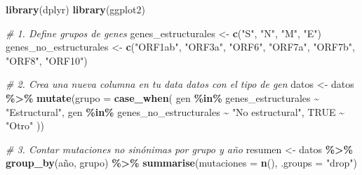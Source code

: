 \documentclass[
]{article}
\newenvironment{Shaded}{\begin{snugshade}}{\end{snugshade}}
\newcommand{\AttributeTok}[1]{\textcolor[rgb]{0.13,0.29,0.53}{#1}}
\newcommand{\CommentTok}[1]{\textcolor[rgb]{0.56,0.35,0.01}{\textit{#1}}}
\newcommand{\ConstantTok}[1]{\textcolor[rgb]{0.56,0.35,0.01}{#1}}
\newcommand{\FunctionTok}[1]{\textcolor[rgb]{0.13,0.29,0.53}{\textbf{#1}}}
\newcommand{\NormalTok}[1]{#1}
\newcommand{\OtherTok}[1]{\textcolor[rgb]{0.56,0.35,0.01}{#1}}
\newcommand{\SpecialCharTok}[1]{\textcolor[rgb]{0.81,0.36,0.00}{\textbf{#1}}}
\newcommand{\StringTok}[1]{\textcolor[rgb]{0.31,0.60,0.02}{#1}}
\begin{document}
\begin{Shaded}
\begin{Highlighting}[]
\FunctionTok{library}\NormalTok{(dplyr)}
\FunctionTok{library}\NormalTok{(ggplot2)}

\CommentTok{\# 1. Define grupos de genes}
\NormalTok{genes\_estructurales }\OtherTok{\textless{}{-}} \FunctionTok{c}\NormalTok{(}\StringTok{"S"}\NormalTok{, }\StringTok{"N"}\NormalTok{, }\StringTok{"M"}\NormalTok{, }\StringTok{"E"}\NormalTok{)}
\NormalTok{genes\_no\_estructurales }\OtherTok{\textless{}{-}} \FunctionTok{c}\NormalTok{(}\StringTok{"ORF1ab"}\NormalTok{, }\StringTok{"ORF3a"}\NormalTok{, }\StringTok{"ORF6"}\NormalTok{, }\StringTok{"ORF7a"}\NormalTok{, }\StringTok{"ORF7b"}\NormalTok{, }\StringTok{"ORF8"}\NormalTok{, }\StringTok{"ORF10"}\NormalTok{)}

\CommentTok{\# 2. Crea una nueva columna en tu data \textasciigrave{}datos\textasciigrave{} con el tipo de gen}
\NormalTok{datos }\OtherTok{\textless{}{-}}\NormalTok{ datos }\SpecialCharTok{\%\textgreater{}\%}
  \FunctionTok{mutate}\NormalTok{(}\AttributeTok{grupo =} \FunctionTok{case\_when}\NormalTok{(}
\NormalTok{    gen }\SpecialCharTok{\%in\%}\NormalTok{ genes\_estructurales }\SpecialCharTok{\textasciitilde{}} \StringTok{"Estructural"}\NormalTok{,}
\NormalTok{    gen }\SpecialCharTok{\%in\%}\NormalTok{ genes\_no\_estructurales }\SpecialCharTok{\textasciitilde{}} \StringTok{"No estructural"}\NormalTok{,}
    \ConstantTok{TRUE} \SpecialCharTok{\textasciitilde{}} \StringTok{"Otro"}
\NormalTok{  ))}

\CommentTok{\# 3. Contar mutaciones no sinónimas por grupo y año}
\NormalTok{resumen }\OtherTok{\textless{}{-}}\NormalTok{ datos }\SpecialCharTok{\%\textgreater{}\%}
  \FunctionTok{group\_by}\NormalTok{(año, grupo) }\SpecialCharTok{\%\textgreater{}\%}
  \FunctionTok{summarise}\NormalTok{(}\AttributeTok{mutaciones =} \FunctionTok{n}\NormalTok{(), }\AttributeTok{.groups =} \StringTok{"drop"}\NormalTok{)}


\end{Highlighting}
\end{Shaded}
\end{document}
